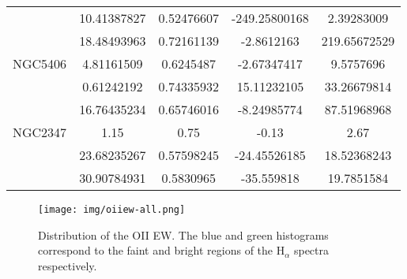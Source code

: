 \begin{table}
\begin{tabular}{ c c c c c }
     & 10.41387827 & 0.52476607 & -249.25800168 & 2.39283009 \\
     & 18.48493963 & 0.72161139 & -2.8612163 & 219.65672529 \\ \hline
    NGC5406  & 4.81161509 & 0.6245487 & -2.67347417 & 9.5757696 \\
     & 0.61242192 & 0.74335932 & 15.11232105 & 33.26679814 \\
     & 16.76435234 & 0.65746016 & -8.24985774 & 87.51968968 \\ \hline
    NGC2347  & 1.15 & 0.75 & -0.13 & 2.67 \\
     & 23.68235267 & 0.57598245 & -24.45526185 & 18.52368243 \\
     & 30.90784931 & 0.5830965 & -35.559818 & 19.7851584 \\ \hline
  \end{tabular}
\end{table}

\begin{figure}[h!]
  \centering
  \texttt{[image: img/oiiew-all.png]}
  \caption{Distribution of the OII EW. The blue and green histograms correspond to the faint and bright regions of the H$_{\alpha}$
  spectra respectively.}
  \label{4-8}
\end{figure}

\justify
